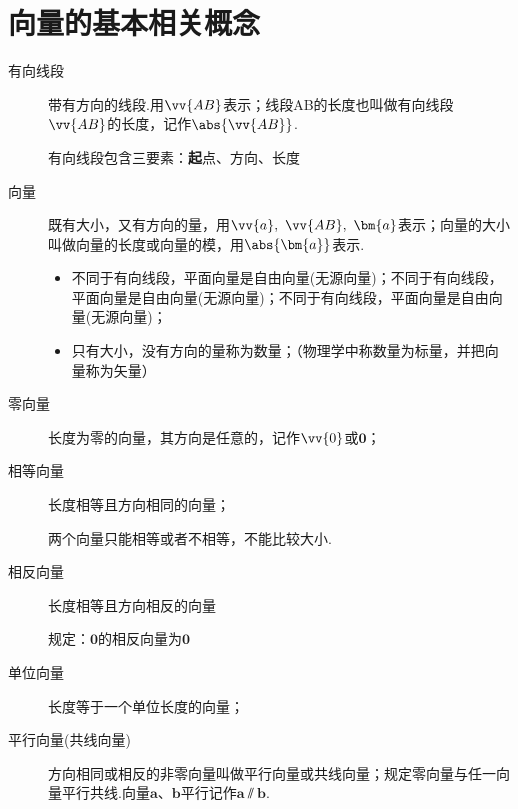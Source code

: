   \newtheorem*{Theorem}{定理}
  \makefront
\vspace{-1.5em}
\startexercise
\section{向量的基本相关概念}
  \begin{description}
    \item[有向线段]带有方向的线段.用$\vv{AB}$表示；线段AB的长度也叫做有向线段$\vv{AB}$的长度，记作$\abs{\vv{AB}}$.\par
    {\kaishu 有向线段包含三要素：{\textbf 起点、方向、长度}}
    \item[向量] 既有大小，又有方向的量，用$ \vv{a},~\vv{AB},~\bm{a} $表示；向量的大小叫做向量的长度或向量的模，用$ \abs{\bm{a}} $表示.\par
    \begin{itemize}[leftmargin=*]
      \kaishu
      \item 不同于有向线段，平面向量是自由向量(无源向量)；不同于有向线段，平面向量是自由向量(无源向量)；不同于有向线段，平面向量是自由向量(无源向量)；
      \item 只有大小，没有方向的量称为数量；（物理学中称数量为标量，并把向量称为矢量）
    \end{itemize}
    \item[零向量] 长度为零的向量，其方向是任意的，记作$ \vv{0} $或$ \bm{0} $；
    \item[相等向量] 长度相等且方向相同的向量；\par
    {\kaishu 两个向量只能相等或者不相等，不能比较大小.}
    \item[相反向量] 长度相等且方向相反的向量\par
    {\kaishu 规定：$\bm{0}$的相反向量为$\bm{0}$}
    \item[单位向量] 长度等于一个单位长度的向量；
    \item[平行向量(共线向量)]方向相同或相反的非零向量叫做平行向量或共线向量；规定零向量与任一向量平行共线.向量$\bm{a}$、$\bm{b}$平行记作$\bm{a}\varparallel \bm{b}$.
  \end{description}
